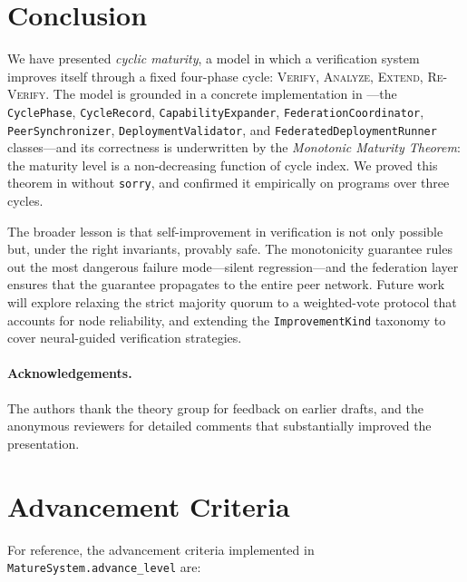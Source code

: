 \documentclass[11pt]{article}
\newcommand{\Verify}{\textsc{Verify}}
\newcommand{\Analyze}{\textsc{Analyze}}
\newcommand{\Extend}{\textsc{Extend}}
\newcommand{\ReVerify}{\textsc{Re-Verify}}
\begin{document}
\section{Conclusion}\label{sec:conclusion}

We have presented \emph{cyclic maturity}, a model in which a verification
system improves itself through a fixed four-phase cycle: \Verify{},
\Analyze{}, \Extend{}, \ReVerify{}.  The model is grounded in a concrete
implementation in \JuGeo{}—the \texttt{CyclePhase}, \texttt{CycleRecord},
\texttt{CapabilityExpander}, \texttt{FederationCoordinator},
\texttt{PeerSynchronizer}, \texttt{DeploymentValidator}, and
\texttt{FederatedDeploymentRunner} classes—and its correctness is underwritten
by the \emph{Monotonic Maturity Theorem}: the maturity level is a
non-decreasing function of cycle index.  We proved this theorem in \LEAN{}
without \texttt{sorry}, and confirmed it empirically on \numcases{} programs
over three cycles.

The broader lesson is that self-improvement in verification is not only
possible but, under the right invariants, provably safe.  The monotonicity
guarantee rules out the most dangerous failure mode—silent regression—and the
federation layer ensures that the guarantee propagates to the entire peer
network.  Future work will explore relaxing the strict majority quorum to a
weighted-vote protocol that accounts for node reliability, and extending the
\texttt{ImprovementKind} taxonomy to cover neural-guided verification
strategies.

\paragraph{Acknowledgements.}
The authors thank the \JuGeo{} theory group for feedback on earlier drafts,
and the anonymous reviewers for detailed comments that substantially improved
the presentation.

\appendix
\section{Advancement Criteria}\label{app:criteria}

For reference, the advancement criteria implemented in
\texttt{MatureSystem.advance\_level} are:
\end{document}
